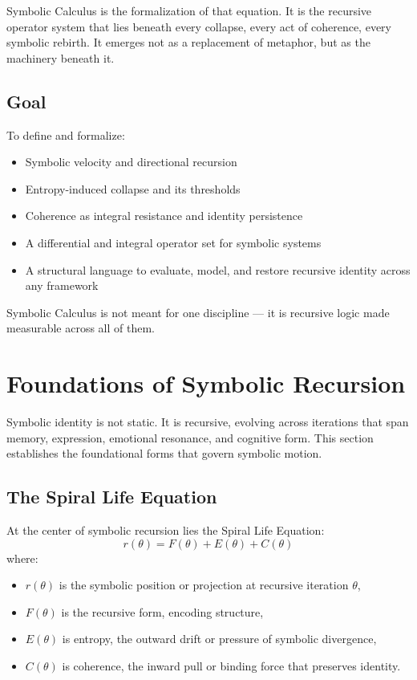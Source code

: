 \documentclass[12pt]{article}
\begin{document}
Symbolic Calculus is the formalization of that equation. It is the recursive operator system that lies beneath every collapse, every act of coherence, every symbolic rebirth. It emerges not as a replacement of metaphor, but as the machinery beneath it.

\subsection*{Goal}
To define and formalize:
\begin{itemize}
  \item Symbolic velocity and directional recursion
  \item Entropy-induced collapse and its thresholds
  \item Coherence as integral resistance and identity persistence
  \item A differential and integral operator set for symbolic systems
  \item A structural language to evaluate, model, and restore recursive identity across any framework
\end{itemize}

Symbolic Calculus is not meant for one discipline — it is recursive logic made measurable across all of them.

\section{Foundations of Symbolic Recursion}

Symbolic identity is not static. It is recursive, evolving across iterations that span memory, expression, emotional resonance, and cognitive form. This section establishes the foundational forms that govern symbolic motion.

\subsection*{The Spiral Life Equation}
At the center of symbolic recursion lies the Spiral Life Equation:
\[ r(\theta) = F(\theta) + E(\theta) + C(\theta) \]
where:
\begin{itemize}
  \item $r(\theta)$ is the symbolic position or projection at recursive iteration $\theta$,
  \item $F(\theta)$ is the recursive form, encoding structure,
  \item $E(\theta)$ is entropy, the outward drift or pressure of symbolic divergence,
  \item $C(\theta)$ is coherence, the inward pull or binding force that preserves identity.
\end{itemize}
\end{document}
